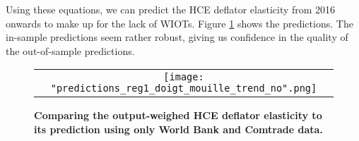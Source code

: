 \documentclass[12pt,a4paper]{paper}
\begin{document}
Using these equations, we can predict the HCE deflator elasticity from 2016 onwards to make up for the lack of WIOTs.
Figure \ref{fig:panel_pred3} shows the predictions. The in-sample predictions seem  rather robust, giving us confidence in the quality of the out-of-sample predictions.


\begin{figure}[H]
	\centering
	\caption{\footnotesize{\textbf{Comparing the output-weighed HCE deflator elasticity to its prediction using only World Bank and Comtrade data.}}}
	\begin{tabular}{c}
		\texttt{[image: "predictions\_reg1\_doigt\_mouille\_trend\_no".png]}\\
	\end{tabular}
	\label{fig:panel_pred3}
\end{figure}
\end{document}
